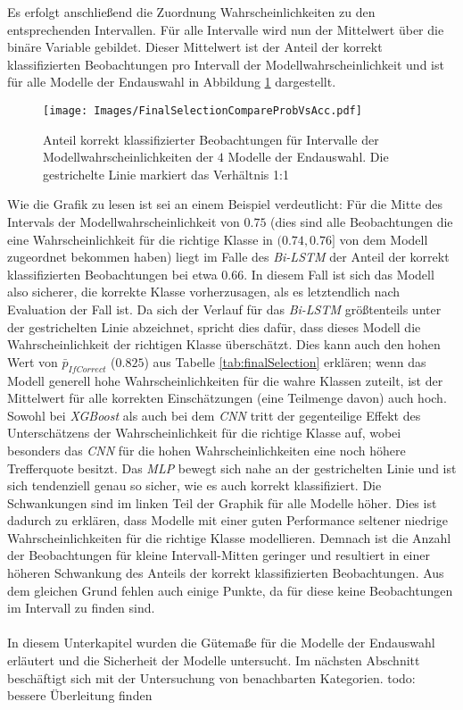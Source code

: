 \documentclass[a4paper,11pt]{article}
\begin{document}
Es erfolgt anschließend die Zuordnung Wahrscheinlichkeiten zu den entsprechenden Intervallen. Für alle Intervalle wird nun der Mittelwert über die binäre Variable gebildet. Dieser Mittelwert ist der Anteil der korrekt klassifizierten Beobachtungen pro Intervall der Modellwahrscheinlichkeit und ist für alle Modelle der Endauswahl in Abbildung \ref{abb:CompareProbVsAcc} dargestellt.


\begin{figure}[ht]
    \centering
\texttt{[image: Images/FinalSelectionCompareProbVsAcc.pdf]} 
\caption{Anteil korrekt klassifizierter Beobachtungen für Intervalle der Modellwahrscheinlichkeiten der $4$ Modelle der Endauswahl. Die gestrichelte Linie markiert das Verhältnis 1:1}
\label{abb:CompareProbVsAcc}
\end{figure}

Wie die Grafik zu lesen ist sei an einem Beispiel verdeutlicht: Für die Mitte des Intervals der Modellwahrscheinlichkeit von $0.75$ (dies sind alle Beobachtungen die eine Wahrscheinlichkeit für die richtige Klasse in $(0.74,0.76]$ von dem Modell zugeordnet bekommen haben) liegt im Falle des \textit{Bi-LSTM} der Anteil der korrekt klassifizierten Beobachtungen bei etwa $0.66$. In diesem Fall ist sich das Modell also sicherer, die korrekte Klasse vorherzusagen, als es letztendlich nach Evaluation der Fall ist. 
Da sich der Verlauf für das \textit{Bi-LSTM} größtenteils unter der gestrichelten Linie abzeichnet, spricht dies dafür, dass dieses Modell die Wahrscheinlichkeit der richtigen Klasse überschätzt. Dies kann auch den hohen Wert von $\bar{p}_{IfCorrect}$ ($0.825$) aus Tabelle \ref{tab:finalSelection} erklären; wenn das Modell generell hohe Wahrscheinlichkeiten für die wahre Klassen zuteilt, ist der Mittelwert für alle korrekten Einschätzungen (eine Teilmenge davon) auch hoch. Sowohl bei \textit{XGBoost} als auch bei dem \textit{CNN} tritt der gegenteilige Effekt des Unterschätzens der Wahrscheinlichkeit für die richtige Klasse auf, wobei besonders das \textit{CNN} für die hohen Wahrscheinlichkeiten eine noch höhere Trefferquote besitzt. Das \textit{MLP} bewegt sich nahe an der gestrichelten Linie und ist sich tendenziell genau so sicher, wie es auch korrekt klassifiziert. Die Schwankungen sind im linken Teil der Graphik für alle Modelle höher. Dies ist dadurch zu erklären, dass Modelle mit einer guten Performance seltener niedrige Wahrscheinlichkeiten für die richtige Klasse modellieren. Demnach ist die Anzahl der Beobachtungen für kleine Intervall-Mitten geringer und resultiert in einer höheren Schwankung des Anteils der korrekt klassifizierten Beobachtungen. Aus dem gleichen Grund fehlen auch einige Punkte, da für diese keine Beobachtungen im Intervall zu finden sind. \\
\\
In diesem Unterkapitel wurden die Gütemaße für die Modelle der Endauswahl erläutert und die Sicherheit der Modelle untersucht.
Im nächsten Abschnitt beschäftigt sich mit der Untersuchung von benachbarten Kategorien. todo: bessere Überleitung finden
\end{document}
